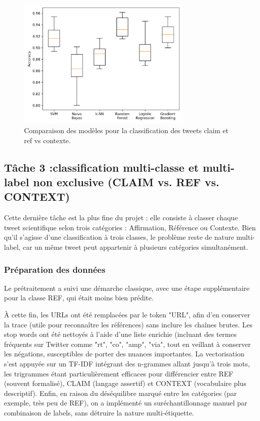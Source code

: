 \begin{figure}[H]
    \centering
    \includegraphics[width=0.75\textwidth]{images/model_comparison_2}
    \caption{Comparaison des modèles pour la classification des tweets claim et ref vs contexte.}
    \label{fig:model_comparison_clmref_context}
\end{figure}

\subsection{Tâche 3 :classification multi-classe et multi-label non exclusive ({CLAIM} vs. {REF} vs. {CONTEXT})}\label{subsec:modele-3:-claim-vs-ref-vs-contexte}
Cette dernière tâche est la plus fine du projet : elle consiste à classer chaque tweet scientifique selon trois catégories : Affirmation, Référence ou Contexte.
Bien qu’il s’agisse d’une classification à trois classes, le problème reste de nature multi-label, car un même tweet peut appartenir à plusieurs catégories simultanément.

\subsubsection{Préparation des données}
Le prétraitement a suivi une démarche classique, avec une étape supplémentaire pour la classe REF, qui était moins bien prédite.

\noindent À cette fin, les URLs ont été remplacées par le token "URL", afin d’en conserver la trace (utile pour reconnaître les références) sans inclure les chaînes brutes.
Les stop words ont été nettoyés à l’aide d’une liste enrichie (incluant des termes fréquents sur Twitter comme "rt", "co", "amp", "via", tout en veillant à conserver les négations, susceptibles de porter des nuances importantes.
La vectorisation s’est appuyée sur un TF-IDF intégrant des n-grammes allant jusqu’à trois mots, les trigrammes étant particulièrement efficaces pour différencier entre REF (souvent formalisé), CLAIM (langage 	assertif) et CONTEXT (vocabulaire plus descriptif).
Enfin, en raison du déséquilibre marqué entre les catégories (par exemple, très peu de REF), on a implémenté un suréchantillonnage manuel par combinaison de labels, sans détruire la nature multi-étiquette.

